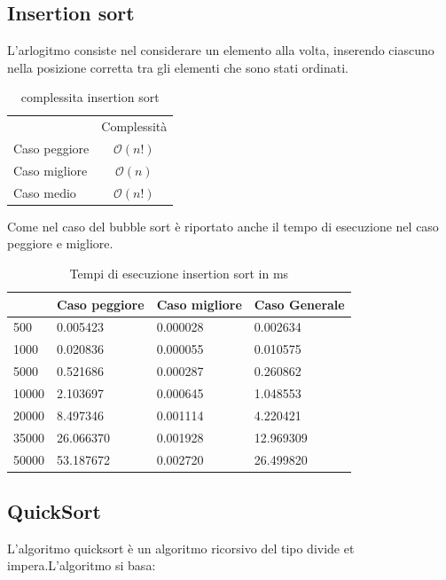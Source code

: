 \documentclass[12pt, a4paper]{report}
\begin{document}
\newpage
\subsection{Insertion sort}
L'arlogitmo consiste nel considerare un elemento alla volta, inserendo ciascuno nella posizione corretta tra gli elementi che sono stati ordinati. 
\begin{table}[ht]
	\centering
	\begin{tabular}{lc}
 & Complessità \\
Caso peggiore & $ \mathcal{O}(n!)$ \\
Caso migliore & $ \mathcal{O}(n)$ \\
Caso medio & $ \mathcal{O}(n!)$\\
\end{tabular}
	\caption{complessita insertion sort}
	\label{Tab:CompInsertionSort}
\end{table}


	

Come nel caso del bubble sort è riportato anche il tempo di esecuzione nel caso peggiore e migliore.

\begin{table}[ht]
\centering
\begin{tabular}{| l | l | l | l |}
\hline
 & Caso peggiore & Caso migliore & Caso Generale \\ \hline
500 & 0.005423 & 0.000028 & 0.002634 \\ \hline
1000 & 0.020836	 & 0.000055 & 0.010575 \\ \hline
5000 & 0.521686 & 0.000287 & 0.260862 \\ \hline
10000 & 2.103697 & 0.000645 & 1.048553 \\ \hline
20000 & 8.497346 & 0.001114 & 4.220421 \\ \hline
35000 & 26.066370 & 0.001928 & 12.969309 \\ \hline
50000 & 53.187672 & 0.002720 & 26.499820 \\ \hline

\end{tabular}
\caption{Tempi di esecuzione insertion sort in ms}
\label{Tab:Tempi esecuzione InsertionSort}
\end{table}


\subsection{QuickSort}
L'algoritmo quicksort è un algoritmo ricorsivo del tipo divide et impera.L'algoritmo si basa:
\end{document}
